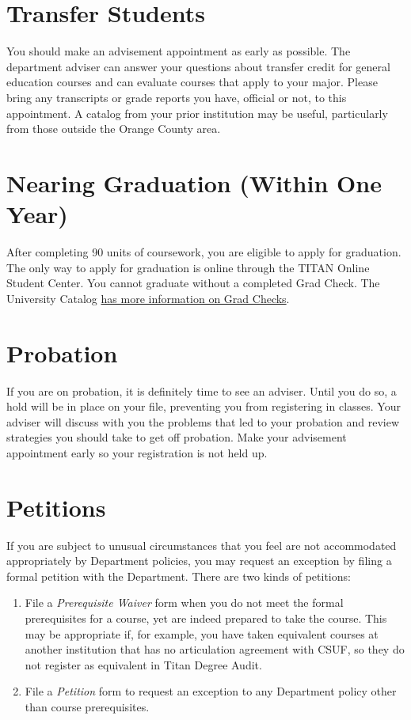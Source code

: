 \documentclass{book}
\newcommand{\CampusName}{CSUF}
\begin{document}
\section{Transfer Students}
You should make an advisement appointment as early as possible. The department adviser can answer your questions about transfer credit for general education courses and can evaluate courses that apply to your major. Please bring any transcripts or grade reports you have, official or not, to this appointment. A catalog from your prior institution may be useful, particularly from those outside the Orange County area.

\section{Nearing Graduation (Within One Year)}
After completing 90 units of coursework, you are eligible to apply for graduation. The only way to apply for graduation is online through the TITAN Online Student Center. You cannot graduate without a completed Grad Check.  The University Catalog \href{http://catalog.fullerton.edu/content.php?catoid=2&navoid=108#Graduation_Requirement_Check}{has more information on Grad Checks}.

\section{Probation}
If you are on probation, it is definitely time to see an adviser. Until you do so, a hold will be in place on your file, preventing you from registering in classes. Your adviser will discuss with you the problems that led to your probation and review strategies you should take to get off probation. Make your advisement appointment early so your registration is not held up.

\section{Petitions}
\label{section:petitions}

If you are subject to unusual circumstances that you feel are not accommodated appropriately by Department policies, you may request an exception by filing a formal petition with the Department. There are two kinds of petitions:
\begin{enumerate}
\item File a \emph{Prerequisite Waiver} form when you do not meet the formal prerequisites for a course, yet are indeed prepared to take the course. This may be appropriate if, for example, you have taken equivalent courses at another institution that has no articulation agreement with \CampusName, so they do not register as equivalent in Titan Degree Audit.
\item File a \emph{Petition} form to request an exception to any Department policy other than course prerequisites.
\end{enumerate}
\end{document}

